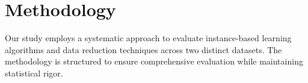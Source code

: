 \section{Methodology}
Our study employs a systematic approach to evaluate instance-based learning algorithms and data reduction techniques across two distinct datasets. The methodology is structured to ensure comprehensive evaluation while maintaining statistical rigor.








